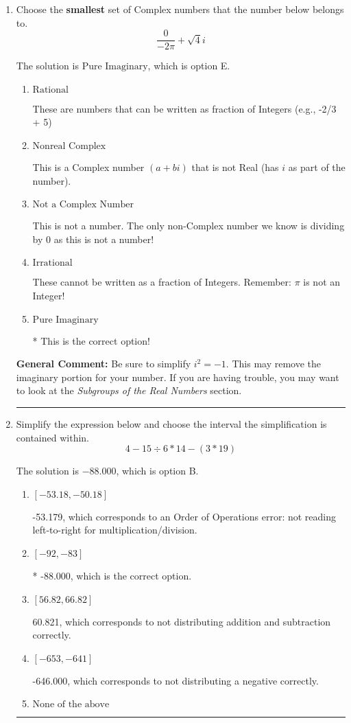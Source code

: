 \documentclass{extbook}[14pt]
\newcommand{\litem}[1]{\item #1

\rule{\textwidth}{0.4pt}}
\begin{document}
\begin{enumerate}\litem{
Choose the \textbf{smallest} set of Complex numbers that the number below belongs to.
\[ \frac{0}{-2 \pi}+\sqrt{4}i \]

The solution is \( \text{Pure Imaginary} \), which is option E.\begin{enumerate}[label=\Alph*.]
\item \( \text{Rational} \)

These are numbers that can be written as fraction of Integers (e.g., -2/3 + 5)
\item \( \text{Nonreal Complex} \)

This is a Complex number $(a+bi)$ that is not Real (has $i$ as part of the number).
\item \( \text{Not a Complex Number} \)

This is not a number. The only non-Complex number we know is dividing by 0 as this is not a number!
\item \( \text{Irrational} \)

These cannot be written as a fraction of Integers. Remember: $\pi$ is not an Integer!
\item \( \text{Pure Imaginary} \)

* This is the correct option!
\end{enumerate}

\textbf{General Comment:} Be sure to simplify $i^2 = -1$. This may remove the imaginary portion for your number. If you are having trouble, you may want to look at the \textit{Subgroups of the Real Numbers} section.
}
\litem{
Simplify the expression below and choose the interval the simplification is contained within.
\[ 4 - 15 \div 6 * 14 - (3 * 19) \]

The solution is \( -88.000 \), which is option B.\begin{enumerate}[label=\Alph*.]
\item \( [-53.18, -50.18] \)

 -53.179, which corresponds to an Order of Operations error: not reading left-to-right for multiplication/division.
\item \( [-92, -83] \)

* -88.000, which is the correct option.
\item \( [56.82, 66.82] \)

 60.821, which corresponds to not distributing addition and subtraction correctly.
\item \( [-653, -641] \)

 -646.000, which corresponds to not distributing a negative correctly.
\item \( \text{None of the above} \)


\end{enumerate}}
\end{enumerate}
\end{document}
